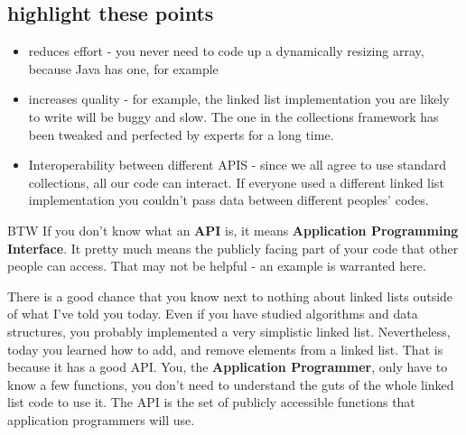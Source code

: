 \documentclass[12pt]{article}
\begin{document}
\subsection{highlight these points}
\begin{itemize}
\item reduces effort - you never need to code up a dynamically resizing array, because Java has one, for example
\item increases quality - for example, the linked list implementation you are likely to write will be buggy and slow. The one in the collections framework has been tweaked and perfected by experts for a long time.
\item Interoperability between different APIS - since we all agree to use standard collections, all our code can interact. If everyone used a different linked list implementation you couldn't pass data between different peoples' codes.
\end{itemize}

BTW If you don't know what an \textbf{API} is, it means \textbf{Application Programming Interface}. It pretty much means the publicly facing part of your code that other people can access. That may not be helpful - an example is warranted here.

There is a good chance that you know next to nothing about linked lists outside of what I've told you today. Even if you have studied algorithms and data structures, you probably implemented a very simplistic linked list. Nevertheless, today you learned how to add, and remove elements from a linked list. That is because it has a good API. You, the \textbf{Application Programmer}, only have to know a few functions, you don't need to understand the guts of the whole linked list code to use it. The API is the set of publicly accessible functions that application programmers will use.
\end{document}
